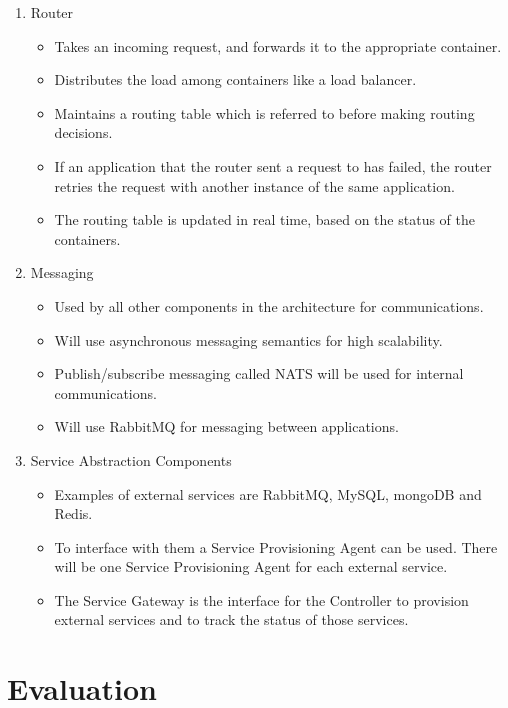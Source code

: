 \documentclass[a4paper]{article}
\begin{document}
\begin{enumerate}
\begin{itemize}
	  \end{itemize}
	  \item Router
	  \begin{itemize}
		  \item Takes an incoming request, and forwards it to the appropriate container.
		  \item Distributes the load among containers like a load balancer.
		  \item Maintains a routing table which is referred to before making routing decisions.
		  \item If an application that the router sent a request to has failed, the router retries the request with another instance of the same application. 
		  \item The routing table is updated in real time, based on the status of the containers.
	  \end{itemize}
	  \item Messaging
	  \begin{itemize}
		  \item Used by all other components in the architecture for communications.
		  \item Will use asynchronous messaging semantics for high scalability.
		  \item Publish/subscribe messaging called NATS will be used for internal communications.
		  \item Will use RabbitMQ for messaging between applications.
	  \end{itemize}
	  \item Service Abstraction Components
	  \begin{itemize}
		  \item Examples of external services are RabbitMQ, MySQL, mongoDB and Redis. 
		  \item To interface with them a Service Provisioning Agent can be used. There will be one Service Provisioning Agent for each external service.  
		  \item The Service Gateway is the interface for the Controller to provision external services and to track the status of those services.
	  \end{itemize}
  \end{enumerate}

  \section{Evaluation}
  
\end{document}
